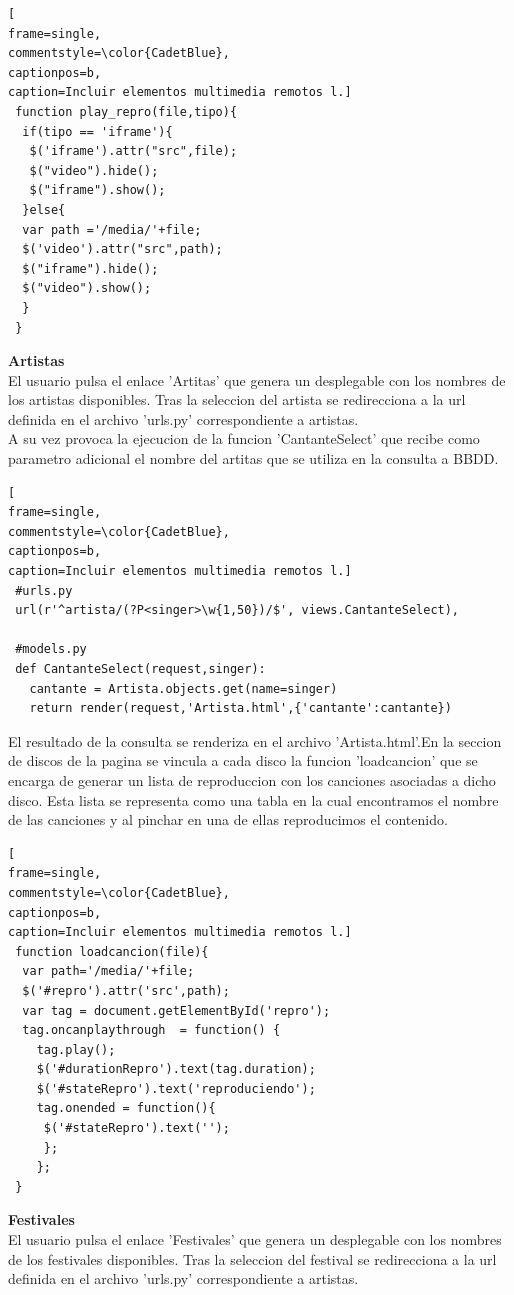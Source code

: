 \begin{lstlisting}[
frame=single,
commentstyle=\color{CadetBlue},
captionpos=b,
caption=Incluir elementos multimedia remotos l.]
 function play_repro(file,tipo){
  if(tipo == 'iframe'){
   $('iframe').attr("src",file);
   $("video").hide();
   $("iframe").show();
  }else{
  var path ='/media/'+file;
  $('video').attr("src",path);
  $("iframe").hide();
  $("video").show();
  }
 }
\end{lstlisting}
\textbf{Artistas}
\\El usuario pulsa el enlace 'Artitas' que genera un desplegable con los nombres de los artistas disponibles. Tras la seleccion del artista se redirecciona a la url definida en el archivo 'urls.py' correspondiente a artistas.
\\A su vez provoca la ejecucion de la funcion 'CantanteSelect' que recibe como parametro adicional el nombre del artitas que se utiliza en la consulta a BBDD.
\begin{lstlisting}[
frame=single,
commentstyle=\color{CadetBlue},
captionpos=b,
caption=Incluir elementos multimedia remotos l.]
 #urls.py
 url(r'^artista/(?P<singer>\w{1,50})/$', views.CantanteSelect),
 
 #models.py
 def CantanteSelect(request,singer):
   cantante = Artista.objects.get(name=singer)
   return render(request,'Artista.html',{'cantante':cantante})
\end{lstlisting}
El resultado de la consulta se renderiza en el archivo 'Artista.html'.En la seccion de discos de la pagina se vincula a cada disco la funcion 'loadcancion' que se encarga de generar un lista de reproduccion con los canciones asociadas a dicho disco. Esta lista se representa como una tabla en la cual encontramos el nombre de las canciones y al pinchar en una de ellas reproducimos el contenido.
\begin{lstlisting}[
frame=single,
commentstyle=\color{CadetBlue},
captionpos=b,
caption=Incluir elementos multimedia remotos l.]
 function loadcancion(file){
  var path='/media/'+file;
  $('#repro').attr('src',path);
  var tag = document.getElementById('repro');
  tag.oncanplaythrough  = function() {
    tag.play();
    $('#durationRepro').text(tag.duration);
    $('#stateRepro').text('reproduciendo');
    tag.onended = function(){
     $('#stateRepro').text('');
     };
    };
 }
\end{lstlisting}
\textbf{Festivales}
\\El usuario pulsa el enlace 'Festivales' que genera un desplegable con los nombres de los festivales disponibles. Tras la seleccion del festival se redirecciona a la url definida en el archivo 'urls.py' correspondiente a artistas.
